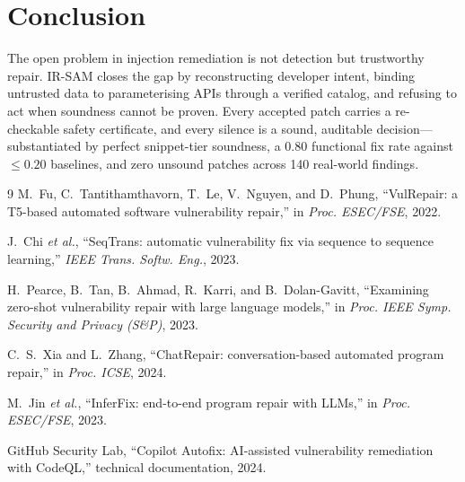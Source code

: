 \documentclass[conference]{IEEEtran}
\newcommand{\irsam}{IR-SAM}
\begin{document}
\section{Conclusion}
The open problem in injection remediation is not detection but
trustworthy repair. \irsam{} closes the gap by reconstructing developer
intent, binding untrusted data to parameterising APIs through a verified
catalog, and refusing to act when soundness cannot be proven. Every
accepted patch carries a re-checkable safety certificate, and every
silence is a sound, auditable decision---substantiated by perfect
snippet-tier soundness, a $0.80$ functional fix rate against $\le 0.20$
baselines, and zero unsound patches across 140 real-world findings.

\begin{thebibliography}{9}
M.~Fu, C.~Tantithamthavorn, T.~Le, V.~Nguyen, and D.~Phung,
``VulRepair: a T5-based automated software vulnerability repair,''
in \emph{Proc. ESEC/FSE}, 2022.

J.~Chi \emph{et al.}, ``SeqTrans: automatic vulnerability fix via
sequence to sequence learning,'' \emph{IEEE Trans. Softw. Eng.}, 2023.

H.~Pearce, B.~Tan, B.~Ahmad, R.~Karri, and B.~Dolan-Gavitt,
``Examining zero-shot vulnerability repair with large language models,''
in \emph{Proc. IEEE Symp. Security and Privacy (S\&P)}, 2023.

C.~S.~Xia and L.~Zhang, ``ChatRepair: conversation-based automated
program repair,'' in \emph{Proc. ICSE}, 2024.

M.~Jin \emph{et al.}, ``InferFix: end-to-end program repair with LLMs,''
in \emph{Proc. ESEC/FSE}, 2023.

GitHub Security Lab, ``Copilot Autofix: AI-assisted vulnerability
remediation with CodeQL,'' technical documentation, 2024.
\end{thebibliography}
\end{document}
